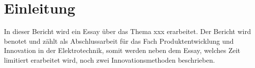 \clearpage
\section{Einleitung}\label{sec:Einleitung}
In dieser Bericht wird ein Essay über das Thema xxx erarbeitet. Der Bericht wird benotet und zählt als Abschlussarbeit für das Fach Produktentwicklung und Innovation in der Elektrotechnik, somit werden neben dem Essay, welches Zeit limitiert erarbeitet wird, noch zwei Innovationsmethoden beschrieben.\\
\newpage







